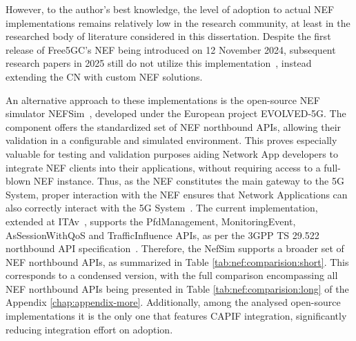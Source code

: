 
However, to the author's best knowledge, the level of adoption to actual \ac{NEF} implementations remains relatively low in the research community, at least in the researched body of literature considered in this dissertation. Despite the first release of Free5GC's \ac{NEF} being introduced on 12 November 2024, subsequent research papers in 2025 still do not utilize this implementation~\cite{LoadBalancingConnectedVehicleServices}, instead extending the \acs{CN} with custom \ac{NEF} solutions.

An alternative approach to these implementations is the open-source \ac{NEF} simulator NEFSim~\cite{NEFsim}, developed under the European project EVOLVED-5G. The component offers the standardized set of \acs{NEF} northbound \acsp{API}, allowing their validation in a configurable and simulated environment. This proves especially valuable for testing and validation purposes aiding Network App developers to integrate \ac{NEF} clients into their applications, without requiring access to a full-blown \ac{NEF} instance. Thus, as the \ac{NEF} constitutes the main gateway to the \ac{5G} System, proper interaction with the \ac{NEF} ensures that Network Applications can also correctly interact with the \acs{5G} System~\cite{AutomatedTestingOrchestrationFramework}. The current implementation, extended at \acs{ITAv}~\cite{NEFemulatorAtnog}, supports the PfdManagement, MonitoringEvent, AsSessionWithQoS and TrafficInfluence \acsp{API}, as per the \acs{3GPP} TS 29.522 northbound \acs{API} specification~\cite{ETSI_TS_129_522_V18_11_0}. Therefore, the NefSim supports a broader set of \acs{NEF} northbound \acsp{API}, as summarized in Table \ref{tab:nef:comparision:short}. This corresponds to a condensed version, with the full comparison encompassing all \acs{NEF} northbound \acsp{API} being presented in Table \ref{tab:nef:comparision:long} of the Appendix \ref{chap:appendix-more}. Additionally, among the analysed open-source implementations it is the only one that features \acs{CAPIF} integration, significantly reducing integration effort on adoption. 


